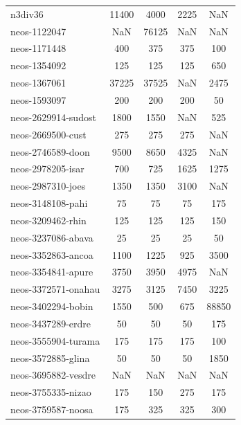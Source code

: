 \begin{longtable}{lcccc}
n3div36                     &    11400 &     4000 &     2225 &   NaN \\
neos-1122047                &      NaN &    76125 &      NaN &   NaN \\
neos-1171448                &      400 &      375 &      375 &   100 \\
neos-1354092                &      125 &      125 &      125 &   650 \\
neos-1367061                &    37225 &    37525 &      NaN &  2475 \\
neos-1593097                &      200 &      200 &      200 &    50 \\
neos-2629914-sudost         &     1800 &     1550 &      NaN &   525 \\
neos-2669500-cust           &      275 &      275 &      275 &   NaN \\
neos-2746589-doon           &     9500 &     8650 &     4325 &   NaN \\
neos-2978205-isar           &      700 &      725 &     1625 &  1275 \\
neos-2987310-joes           &     1350 &     1350 &     3100 &   NaN \\
neos-3148108-pahi           &       75 &       75 &       75 &   175 \\
neos-3209462-rhin           &      125 &      125 &      125 &   150 \\
neos-3237086-abava          &       25 &       25 &       25 &    50 \\
neos-3352863-ancoa          &     1100 &     1225 &      925 &  3500 \\
neos-3354841-apure          &     3750 &     3950 &     4975 &   NaN \\
neos-3372571-onahau         &     3275 &     3125 &     7450 &  3225 \\
neos-3402294-bobin          &     1550 &      500 &      675 & 88850 \\
neos-3437289-erdre          &       50 &       50 &       50 &   175 \\
neos-3555904-turama         &      175 &      175 &      175 &   100 \\
neos-3572885-glina          &       50 &       50 &       50 &  1850 \\
neos-3695882-vesdre         &      NaN &      NaN &      NaN &   NaN \\
neos-3755335-nizao          &      175 &      150 &      275 &   175 \\
neos-3759587-noosa          &      175 &      325 &      325 &   300 \\

\end{longtable}
